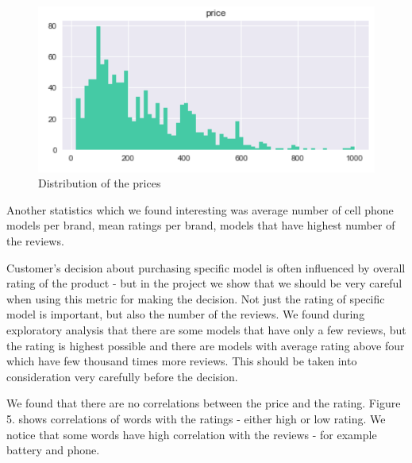 \documentclass[11pt]{article}
\begin{document}
\begin{figure}[h!]
  \centering
    \includegraphics[width=\linewidth]{priceDistribution.png}
  \caption{Distribution of the prices}
  \label{fig:priceDistribution}
\end{figure}

Another statistics which we found interesting was average number of cell phone models per brand, mean ratings per brand, models that have highest number of the reviews. 

Customer's decision about purchasing specific model is often influenced by overall rating of the product - but in the project we show that we should be very careful when using this metric for making the decision. Not just the rating of specific model is important, but also the number of the reviews. We found during exploratory analysis that there are some models that have only a few reviews, but the rating is highest possible and there are models with average rating above four which have few thousand times more reviews. This should be taken into consideration very carefully before the decision.

We found that there are no correlations between the price and the rating. Figure 5. shows correlations of words with the ratings - either high or low rating. We notice that some words have high correlation with the reviews - for example battery and phone. 
\end{document}
